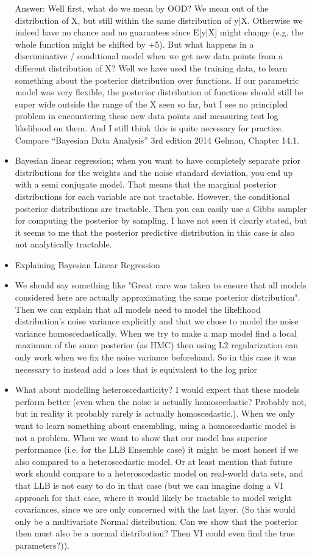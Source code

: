 \documentclass[12pt, A4, twoside]{report}
\begin{document}
\begin{itemize}
  Answer:
  Well first, what do we mean by OOD? We mean out of the distribution of X, but still within the same distribution of y|X. Otherwise we indeed have no chance and no guarantees since E[y|X] might change (e.g. the whole function might be shifted by +5). But what happens in a discriminative / conditional model when we get new data points from a different distribution of X? Well we have used the training data, to learn something about the posterior distribution over functions. If our parametric model was very flexible, the posterior distribution of functions should still be super wide outside the range of the X seen so far, but I see no principled problem in encountering these new data points and measuring test log likelihood on them. And I still think this is quite necessary for practice. Compare “Bayesian Data Analysis” 3rd edition 2014 Gelman, Chapter 14.1.
  \item Bayesian linear regression; when you want to have completely separate prior distributions for the weights and the noise standard deviation, you end up with a semi conjugate model. That means that the marginal posterior distributions for each variable are not tractable. However, the conditional posterior distributions are tractable. Then you can easily use a Gibbs sampler for computing the posterior by sampling. I have not seen it clearly stated, but it seems to me that the posterior predictive distribution in this case is also not analytically tractable.
  \item Explaining Bayesian Linear Regression
  \item We should say something like "Great care was taken to ensure that all models considered here are actually approximating the same posterior distribution". Then we can explain that all models need to model the likelihood distribution's noise variance explicitly and that we chose to model the noise variance homoscedastically. When we try to make a map model find a local maximum of the same posterior (as HMC) then using L2 regularization can only work when we fix the noise variance beforehand. So in this case it was necessary to instead add a loss that is equivalent to the log prior
  \item What about modelling heteroscedasticity? I would expect that these models perform better (even when the noise is actually homoscedastic? Probably not, but in reality it probably rarely is actually homoscedastic.). When we only want to learn something about ensembling, using a homoscedastic model is not a problem. When we want to show that our model has superior performance (i.e. for the LLB Ensemble case) it might be most honest if we also compared to a heteroscedastic model. Or at least mention that future work should compare to a heteroscedastic model on real-world data sets, and that LLB is not easy to do in that case (but we can imagine doing a VI approach for that case, where it would likely be tractable to model weight covariances, since we are only concerned with the last layer. (So this would only be a multivariate Normal distribution. Can we show that the posterior then must also be a normal distribution? Then VI could even find the true parameters?)). 

\end{itemize}
\end{document}
